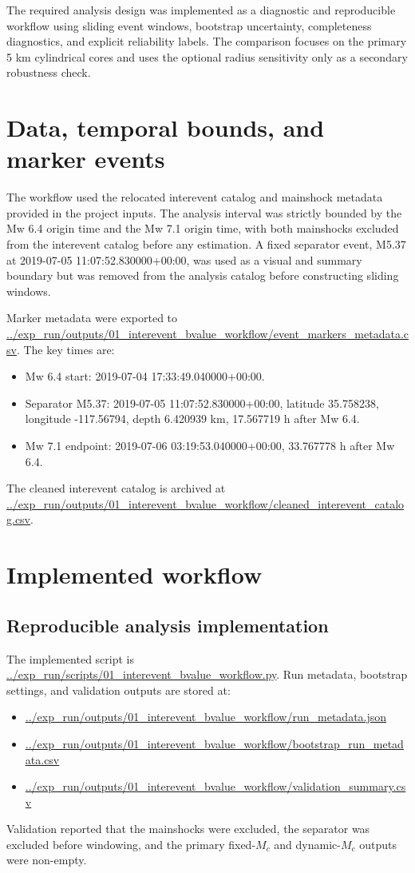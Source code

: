 \documentclass[11pt]{article}
\begin{document}
The required analysis design was implemented as a diagnostic and reproducible workflow using sliding event windows, bootstrap uncertainty, completeness diagnostics, and explicit reliability labels. The comparison focuses on the primary 5 km cylindrical cores and uses the optional radius sensitivity only as a secondary robustness check.

\section{Data, temporal bounds, and marker events}
The workflow used the relocated interevent catalog and mainshock metadata provided in the project inputs. The analysis interval was strictly bounded by the Mw 6.4 origin time and the Mw 7.1 origin time, with both mainshocks excluded from the interevent catalog before any estimation. A fixed separator event, M5.37 at 2019-07-05 11:07:52.830000+00:00, was used as a visual and summary boundary but was removed from the analysis catalog before constructing sliding windows.

Marker metadata were exported to \url{../exp_run/outputs/01_interevent_bvalue_workflow/event_markers_metadata.csv}. The key times are:
\begin{itemize}[leftmargin=1.5em]
    \item Mw 6.4 start: 2019-07-04 17:33:49.040000+00:00.
    \item Separator M5.37: 2019-07-05 11:07:52.830000+00:00, latitude 35.758238, longitude -117.56794, depth 6.420939 km, 17.567719 h after Mw 6.4.
    \item Mw 7.1 endpoint: 2019-07-06 03:19:53.040000+00:00, 33.767778 h after Mw 6.4.
\end{itemize}

The cleaned interevent catalog is archived at \url{../exp_run/outputs/01_interevent_bvalue_workflow/cleaned_interevent_catalog.csv}.

\section{Implemented workflow}
\subsection{Reproducible analysis implementation}
The implemented script is
\url{../exp_run/scripts/01_interevent_bvalue_workflow.py}.
Run metadata, bootstrap settings, and validation outputs are stored at:
\begin{itemize}[leftmargin=1.5em]
    \item \url{../exp_run/outputs/01_interevent_bvalue_workflow/run_metadata.json}
    \item \url{../exp_run/outputs/01_interevent_bvalue_workflow/bootstrap_run_metadata.csv}
    \item \url{../exp_run/outputs/01_interevent_bvalue_workflow/validation_summary.csv}
\end{itemize}
Validation reported that the mainshocks were excluded, the separator was excluded before windowing, and the primary fixed-$M_c$ and dynamic-$M_c$ outputs were non-empty.
\end{document}
